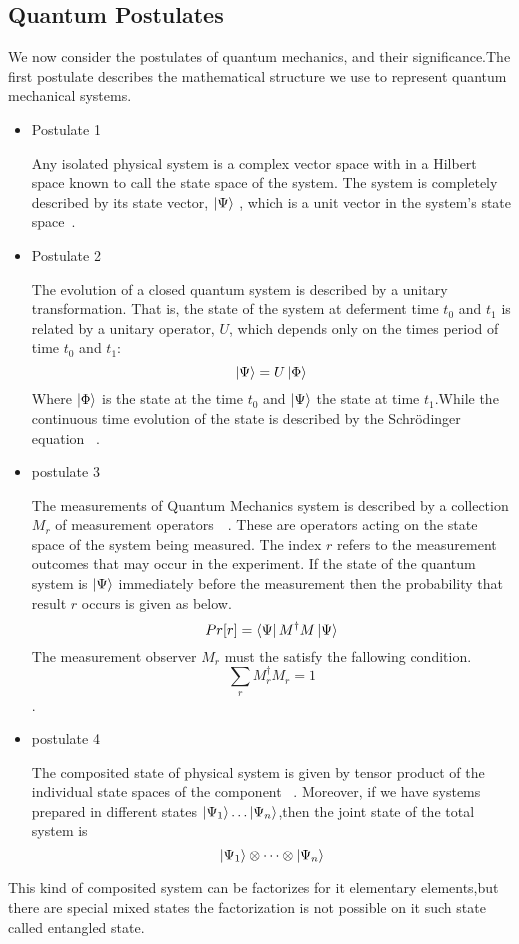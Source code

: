 \subsection{Quantum Postulates}


We now consider the postulates of quantum mechanics, and their significance.The first postulate describes the mathematical structure we use to represent quantum mechanical systems.
\begin{itemize}
\item {Postulate 1}

Any isolated physical system is a complex vector space with in a Hilbert space known to call the state space of the system. The system is completely described by its state vector, $\ket{\Psi}$ , which is a unit vector in the system’s state space~\cite{book:17312}.
\item{Postulate 2}

The evolution of a closed quantum system is described by a unitary transformation. That is, the state of the system at deferment time $t_0$ and $t_1$ is related  by a unitary operator, $U$, which depends only on the times period of time $t_0$ and $t_1$:
$$\ket{\Psi}=U\ket{\Phi}$$
Where $\ket{\Phi}$ is the state at the time $t_0$ and $\ket{\Psi}$ the state at time $t_1$.While the continuous time evolution  of the state is described by the Schrödinger equation ~\cite{book:17312}.
\item{postulate 3}

The measurements of Quantum Mechanics system  is described by a collection ${M_r }$ of measurement operators~\citep{book:17312}~. These are operators acting on the state space of the system being
measured. The index $r $ refers to the measurement outcomes that may occur in the experiment. If the state of the quantum system is $\ket{\Psi}$ immediately before the measurement then the probability that result $r$ occurs is given as below.
$$Pr[r]=\bra{\Psi}M^{\dagger}  M\ket{\Psi}$$ 
The measurement observer ${M_r }$ must the satisfy the fallowing condition.
$$\sum_r M_{r}^{\dagger} M_r=1$$.


\item{postulate 4}

The composited state of physical system is given by  tensor product of the individual state spaces of the component~\citep{book:889079} . Moreover, if we have systems prepared  in different  states $\ket{\Psi_1} \dots \ket{\Psi_n}$,then the joint state of the total system is
$$\ket{\Psi_1}\otimes\dots \otimes\ket{\Psi_n}$$
\end{itemize}
This kind of composited system can be factorizes for it elementary elements,but there are special mixed states the factorization is not possible  on it such state called entangled state.
